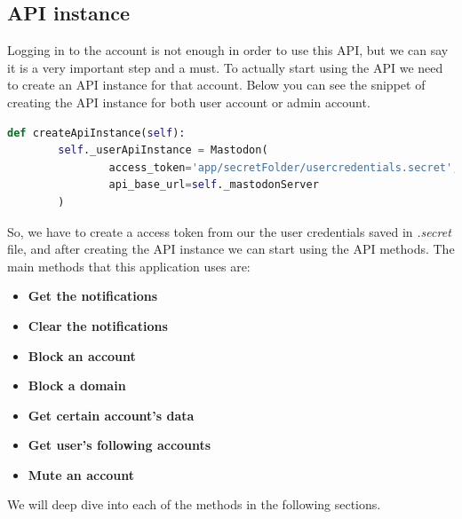 \subsection{API instance}\label{ss:api_instance}
Logging in to the account is not enough in order to use this API, but we can say it is a very important step and a must. To actually start using the API we need to create an API instance for that account. Below you can see the snippet of creating the API instance for both user account or admin account.
\\[5pt]
\begin{lstlisting}[language=python, caption={Creating API instance}, captionpos=b]
	def createApiInstance(self):
		self._userApiInstance = Mastodon(
				access_token='app/secretFolder/usercredentials.secret',
				api_base_url=self._mastodonServer
		)
\end{lstlisting}
So, we have to create a access token from our the user credentials saved in \textit{.secret} file, and after creating the API instance we can start using the API methods. The main methods that this application uses are:
\begin{itemize}
	\item \textbf{Get the notifications}
	\item \textbf{Clear the notifications}
	\item \textbf{Block an account}
	\item \textbf{Block a domain}
	\item \textbf{Get certain account's data}
	\item \textbf{Get user's following accounts}
	\item \textbf{Mute an account}
\end{itemize}
We will deep dive into each of the methods in the following sections.
